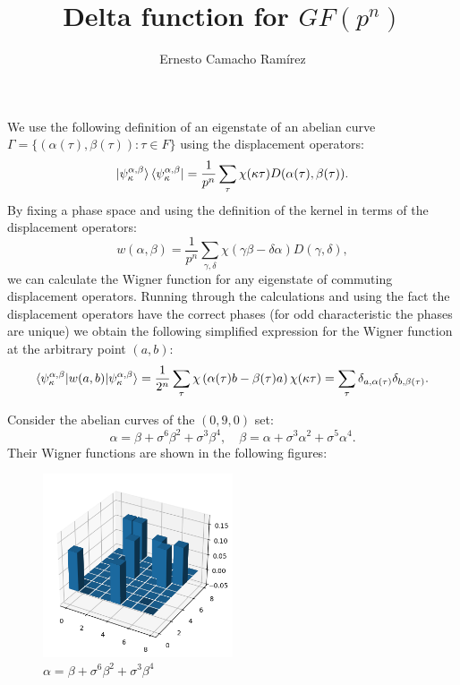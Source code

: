 \documentclass[a4paper]{article}
\title{Delta function for $GF(p^{n})$}
\author{Ernesto Camacho Ramírez}
\begin{document}
  \maketitle

  We use the following definition of an eigenstate of an
  abelian curve $\Gamma = \{(\alpha(\tau),\beta(\tau)) :
  \tau \in F\}$ using the displacement operators:
  \begin{equation}
    \ket{\psi_\kappa^{\alpha,\beta}}
    \bra{\psi_\kappa^{\alpha,\beta}}
    = \frac{1}{p^{n}}
    \sum_{\tau}^{} \chi(\kappa\tau)
    D(\alpha(\tau),\beta(\tau)).
  \end{equation}
  By fixing a phase space and using the definition of the
  kernel in terms of the displacement operators:
  \begin{equation}
    w(\alpha,\beta)
    = \frac{1}{p^{n}} \sum_{\gamma,\delta}^{}
    \chi(\gamma\beta - \delta\alpha) D(\gamma,\delta),
  \end{equation}
  we can calculate the Wigner function for any eigenstate of
  commuting displacement operators.  Running through the
  calculations and using the fact the displacement operators
  have the correct phases (for odd characteristic the phases
  are unique) we obtain the following simplified expression
  for the Wigner function at the arbitrary point $(a,b)$:
  \begin{equation}
    \braket{
      \psi_{\kappa}^{\alpha,\beta}|w(a,b)|
      \psi_{\kappa}^{\alpha,\beta}
    }
    = \frac{1}{2^{n}}
    \sum_{\tau}^{}
    \chi\left( \alpha(\tau)b - \beta(\tau)a \right)
    \chi(\kappa\tau)
    = \sum_{\tau}^{} \delta_{a,\alpha(\tau)}
    \delta_{b,\beta(\tau)}.
  \end{equation}

  Consider the abelian curves of the $(0,9,0)$ set:
  \begin{equation}
    \alpha = \beta + \sigma^6 \beta^2 + \sigma^3 \beta^{4},
    \quad
    \beta = \alpha + \sigma^3 \alpha^2 + \sigma^5 \alpha^4.
  \end{equation}
  Their Wigner functions are shown in the following figures:

  \begin{figure}[ht]
    \centering
    \includegraphics[width=0.5\textwidth]{090-1.png}
    \caption{$\alpha = \beta + \sigma^6 \beta^2 + \sigma^3 \beta^{4}$}
    \label{fig:090-1}
  \end{figure}
\end{document}
